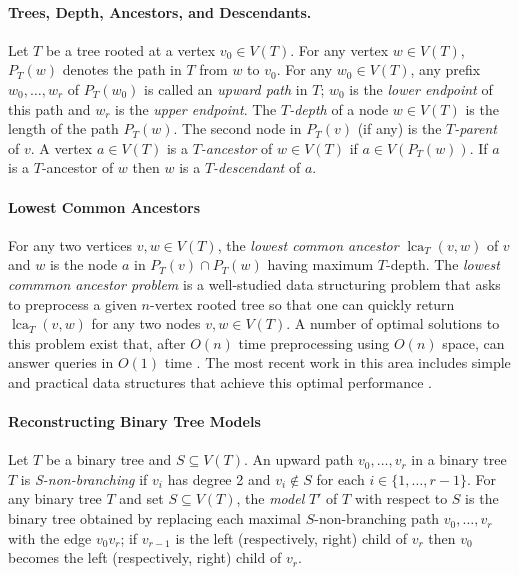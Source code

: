 \documentclass{patmorin}
\DeclareMathOperator{\lca}{lca}
\begin{document}
\paragraph{Trees, Depth, Ancestors, and Descendants.}

Let $T$ be a tree rooted at a vertex $v_0\in V(T)$.  For any vertex $w\in V(T)$, $P_T(w)$ denotes the path in $T$ from $w$ to $v_0$.  For any $w_0\in V(T)$, any prefix $w_0,\ldots,w_r$ of $P_T(w_0)$ is called an \emph{upward path} in $T$; $w_0$ is the \emph{lower endpoint} of this path and $w_r$ is the \emph{upper endpoint}.  The \emph{$T$-depth} of a node $w\in V(T)$ is the length of the path $P_T(w)$. The second node in $P_T(v)$ (if any) is the \emph{$T$-parent} of $v$.  A vertex $a\in V(T)$ is a \emph{$T$-ancestor} of $w\in V(T)$ if $a\in V(P_T(w))$. If $a$ is a $T$-ancestor of $w$ then $w$ is a \emph{$T$-descendant} of $a$.



\paragraph{Lowest Common Ancestors}

For any two vertices $v,w\in V(T)$, the \emph{lowest common ancestor} $\lca_T(v,w)$ of $v$ and $w$ is the node $a$ in $P_T(v)\cap P_T(w)$ having maximum $T$-depth.  The \emph{lowest commmon ancestor problem} is a well-studied data structuring problem that asks to preprocess a given $n$-vertex rooted tree so that one can quickly return $\lca_T(v,w)$ for any two nodes $v,w\in V(T)$. A number of optimal solutions to this problem exist that, after $O(n)$ time preprocessing using $O(n)$ space, can answer queries in $O(1)$ time \cite{berman.vishkin:recursive,shieber.vishkin:on,harel.tarjan:fast,alstrup.gavoille.ea:nearest,bender.farach-colton:lca,fischer.heun:theoretical}.  The most recent work in this area includes simple and practical data structures that achieve this optimal performance \cite{alstrup.gavoille.ea:nearest,bender.farach-colton:lca,fischer.heun:theoretical}.

\paragraph{Reconstructing Binary Tree Models}

Let $T$ be a binary tree and $S \subseteq V(T)$. An upward path $v_0,\ldots,v_r$ in a binary tree $T$ is \emph{S-non-branching} if $v_{i}$ has degree 2 and $v_i \notin S$ for each $i\in\{1,\ldots,r-1\}$. For any binary tree $T$ and set $S \subseteq V(T)$, the \emph{model} $T'$ of $T$ with respect to $S$ is the binary tree obtained by replacing each maximal $S$-non-branching path $v_0,\ldots,v_r$ with the edge $v_0v_r$; if $v_{r-1}$ is the left (respectively, right) child of $v_r$ then $v_0$ becomes the left (respectively, right) child of $v_r$.
\end{document}
